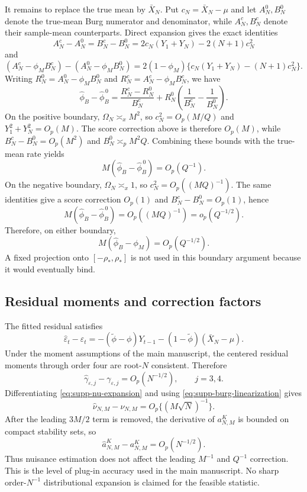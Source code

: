 \documentclass[12pt]{article}
\theoremstyle{remark}
\begin{document}
It remains to replace the true mean by $\bar X_N$. Put
$c_N=\bar X_N-\mu$ and let $A_N^0,B_N^0$ denote the true-mean Burg
numerator and denominator, while $A_N^c,B_N^c$ denote their sample-mean
counterparts. Direct expansion gives the exact identities
\[
A_N^c-A_N^0
=
B_N^c-B_N^0
=
2c_N(Y_1+Y_N)-2(N+1)c_N^2
\]
and
\[
(A_N^c-\phi_MB_N^c)-(A_N^0-\phi_MB_N^0)
=
2(1-\phi_M)
\{c_N(Y_1+Y_N)-(N+1)c_N^2\}.
\]
Writing $R_N^0=A_N^0-\phi_MB_N^0$ and
$R_N^c=A_N^c-\phi_MB_N^c$, we have
\[
\widehat\phi_B-\widehat\phi_B^{\,0}
=
\frac{R_N^c-R_N^0}{B_N^c}
+
R_N^0\left(\frac1{B_N^c}-\frac1{B_N^0}\right).
\]
On the positive boundary, $\Omega_N\asymp_x M^2$, so
$c_N^2=O_p(M/Q)$ and $Y_1^2+Y_N^2=O_p(M)$. The score correction above is therefore $O_p(M)$, while
$B_N^c-B_N^0=O_p(M^2)$ and $B_N^0\asymp_p M^2Q$. Combining these bounds with the true-mean rate yields
\[
M(\widehat\phi_B-\widehat\phi_B^{\,0})=O_p(Q^{-1}).
\]
On the negative boundary, $\Omega_N\asymp_x1$, so
$c_N^2=O_p((MQ)^{-1})$. The same identities give a score correction
$O_p(1)$ and $B_N^c-B_N^0=O_p(1)$, hence
\[
M(\widehat\phi_B-\widehat\phi_B^{\,0})
=O_p((MQ)^{-1})=o_p(Q^{-1/2}).
\]
Therefore, on either boundary,
\[
M(\widehat\phi_B-\phi_M)=O_p(Q^{-1/2}).
\]
A fixed projection onto $[-\rho_*,\rho_*]$ is not used in this boundary
argument because it would eventually bind.

\subsection{Residual moments and correction factors}
The fitted residual satisfies
\[
\widehat\varepsilon_t-\varepsilon_t
=-(\widetilde\phi-\phi)Y_{t-1}-(1-\widetilde\phi)(\bar X_N-\mu).
\]
Under the moment assumptions of the main manuscript, the centered residual moments through order four are root-$N$ consistent. Therefore
\[
\widehat\gamma_{\varepsilon,j}-\gamma_{\varepsilon,j}=O_p(N^{-1/2}),\qquad j=3,4.
\]
Differentiating \eqref{eq:supp-nu-expansion} and using \eqref{eq:supp-burg-linearization} gives
\begin{equation*}
\widehat\nu_{N,M}-\nu_{N,M}=O_p\{(M\sqrt N)^{-1}\}.
\end{equation*}
After the leading $3M/2$ term is removed, the derivative of $a^K_{N,M}$ is bounded on compact stability sets, so
\begin{equation*}
\widehat a^K_{N,M}-a^K_{N,M}=O_p(N^{-1/2}).
\end{equation*}
Thus nuisance estimation does not affect the leading $M^{-1}$ and $Q^{-1}$ correction. This is the level of plug-in accuracy used in the main manuscript. No sharp order-$N^{-1}$ distributional expansion is claimed for the feasible statistic.
\end{document}

